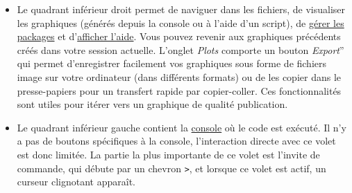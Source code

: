 \documentclass[
  french,
]{scrbook}
\begin{document}
\begin{itemize}
  L'onglet \emph{History} contient l'historique des commandes que vous avez précédemment exécutées dans votre session R. Il est vivement recommande de sauvegarder votre code dans un fichier .R, même pour les analyses et les expériences les plus brèves. Si vous travaillez de manière expéditive sans enregistrer, vous pouvez utiliser l'historique pour parcourir vos commandes précédentes afin de les réutiliser et de les modifier. Vous pouvez également enregistrer l'historique de vos commandes R dans un fichier texte. Ce n'est cependant pas une méthode efficace pour garder une trace de votre travail. Une meilleure stratégie consiste à écrire du code dans l'éditeur de texte, entrecoupé de commentaires qui expliquent ce que fait le code, et d'enregistrer ce document sur votre ordinateur.
\item
  Le quadrant inférieur droit permet de naviguer dans les fichiers, de visualiser les graphiques (générés depuis la console ou à l'aide d'un script), de \protect\hyperlink{packages}{gérer les packages} et d'\protect\hyperlink{aide}{afficher l'aide}. Vous pouvez revenir aux graphiques précédents créés dans votre session actuelle. L'onglet \emph{Plots} comporte un bouton \emph{Export}'' qui permet d'enregistrer facilement vos graphiques sous forme de fichiers image sur votre ordinateur (dans différents formats) ou de les copier dans le presse-papiers pour un transfert rapide par copier-coller. Ces fonctionnalités sont utiles pour itérer vers un graphique de qualité publication.
\item
  Le quadrant inférieur gauche contient la \protect\hyperlink{r-console}{console} où le code est exécuté. Il n'y a pas de boutons spécifiques à la console, l'interaction directe avec ce volet est donc limitée. La partie la plus importante de ce volet est l'invite de commande, qui débute par un chevron \texttt{\textgreater{}}, et lorsque ce volet est actif, un curseur clignotant apparaît.
\end{itemize}
\end{document}
